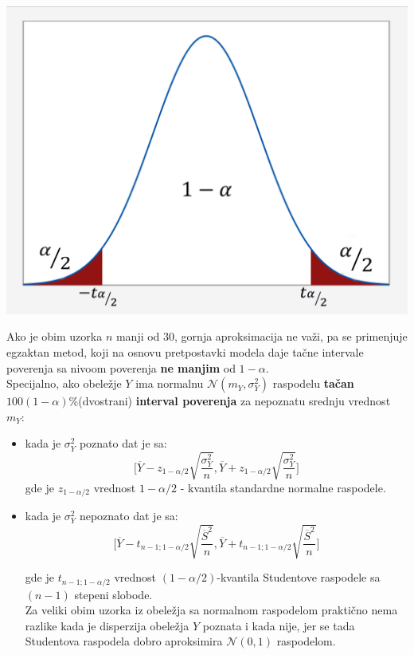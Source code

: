 \documentclass[10pt,a4paper,]{article}
\begin{document}
\includegraphics[scale=0.2]{primer9.png}

Ako je obim uzorka $n$ manji od 30, gornja aproksimacija ne važi, 
pa se primenjuje egzaktan 
metod, koji na osnovu pretpostavki modela daje tačne intervale poverenja sa nivoom 
poverenja \textbf{ne manjim} od $1-\alpha$.
\\[0.2cm]
Specijalno, ako obeležje $Y$ ima normalnu $\mathcal{N}(m_Y,\sigma_{Y}^2)$ raspodelu 
\textbf{tačan}
$100 (1 - \alpha)\%$(dvostrani) \textbf{interval poverenja} za nepoznatu srednju vrednost $m_Y$:

\begin{itemize}
\item kada je $\sigma_{Y}^2$ poznato dat je sa:
$$\Bigg[\overline{Y} - z_{1-\alpha /2}\sqrt{\frac{\sigma_{Y}^2}{n}},
	\overline{Y} + z_{1-\alpha /2}\sqrt{\frac{\sigma_{Y}^2}{n}}\Bigg]
$$
gde je $z_{1-\alpha /2}$ vrednost $1 - \alpha / 2$ - kvantila standardne normalne
raspodele.

\item kada je $\sigma_{Y}^2$ nepoznato dat je sa:
$$\Bigg[\overline{Y} - t_{n-1;1-\alpha /2}\sqrt{\frac{\overline{S}^2}{n}},
	\overline{Y} + t_{n-1; 1-\alpha /2}\sqrt{\frac{\overline{S}^2}{n}}\Bigg]
$$

gde je $t_{n-1; 1-\alpha /2}$ vrednost $(1 - \alpha / 2)$-kvantila Studentove raspodele
sa $(n-1)$ stepeni slobode.
\\
Za veliki obim uzorka iz obeležja sa normalnom raspodelom praktično nema razlike kada je 
disperzija obeležja $Y$ poznata i kada nije, jer se tada Studentova raspodela dobro 
aproksimira $\mathcal{N}(0,1)$ raspodelom.
   

\end{itemize}
\end{document}
